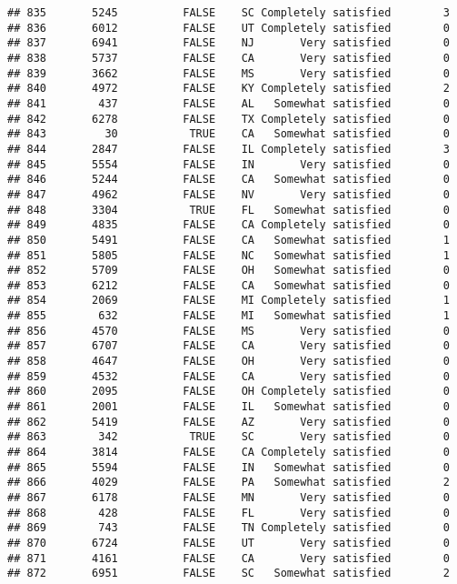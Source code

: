 \documentclass[]{book}
\theoremstyle{definition}
\theoremstyle{definition}
\theoremstyle{remark}
\begin{document}
\begin{verbatim}
## 835       5245          FALSE    SC Completely satisfied        3
## 836       6012          FALSE    UT Completely satisfied        0
## 837       6941          FALSE    NJ       Very satisfied        0
## 838       5737          FALSE    CA       Very satisfied        0
## 839       3662          FALSE    MS       Very satisfied        0
## 840       4972          FALSE    KY Completely satisfied        2
## 841        437          FALSE    AL   Somewhat satisfied        0
## 842       6278          FALSE    TX Completely satisfied        0
## 843         30           TRUE    CA   Somewhat satisfied        0
## 844       2847          FALSE    IL Completely satisfied        3
## 845       5554          FALSE    IN       Very satisfied        0
## 846       5244          FALSE    CA   Somewhat satisfied        0
## 847       4962          FALSE    NV       Very satisfied        0
## 848       3304           TRUE    FL   Somewhat satisfied        0
## 849       4835          FALSE    CA Completely satisfied        0
## 850       5491          FALSE    CA   Somewhat satisfied        1
## 851       5805          FALSE    NC   Somewhat satisfied        1
## 852       5709          FALSE    OH   Somewhat satisfied        0
## 853       6212          FALSE    CA   Somewhat satisfied        0
## 854       2069          FALSE    MI Completely satisfied        1
## 855        632          FALSE    MI   Somewhat satisfied        1
## 856       4570          FALSE    MS       Very satisfied        0
## 857       6707          FALSE    CA       Very satisfied        0
## 858       4647          FALSE    OH       Very satisfied        0
## 859       4532          FALSE    CA       Very satisfied        0
## 860       2095          FALSE    OH Completely satisfied        0
## 861       2001          FALSE    IL   Somewhat satisfied        0
## 862       5419          FALSE    AZ       Very satisfied        0
## 863        342           TRUE    SC       Very satisfied        0
## 864       3814          FALSE    CA Completely satisfied        0
## 865       5594          FALSE    IN   Somewhat satisfied        0
## 866       4029          FALSE    PA   Somewhat satisfied        2
## 867       6178          FALSE    MN       Very satisfied        0
## 868        428          FALSE    FL       Very satisfied        0
## 869        743          FALSE    TN Completely satisfied        0
## 870       6724          FALSE    UT       Very satisfied        0
## 871       4161          FALSE    CA       Very satisfied        0
## 872       6951          FALSE    SC   Somewhat satisfied        2

\end{verbatim}
\end{document}
